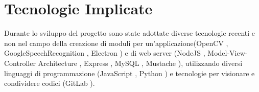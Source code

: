 \chapter{Tecnologie Implicate}

Durante lo sviluppo del progetto sono state adottate diverse tecnologie recenti
e non nel campo della creazione di moduli per un'applicazione(OpenCV \cite{OpenCV-website},
GoogleSpeechRecognition \cite{GoogleSTT-website}, Electron \cite{Electron-website})
e di web server (NodeJS \cite{NodeJS-website},  Model-View-Controller Architecture \cite{MVC-Architecture},
Express \cite{Express-website}, MySQL \cite{MySQL}, Mustache \cite{Mustache}),
utilizzando diversi linguaggi di programmazione (JavaScript \cite{JavaScript}, Python \cite{Python})
e tecnologie per visionare e condividere codici (GitLab \cite{git-website}).
